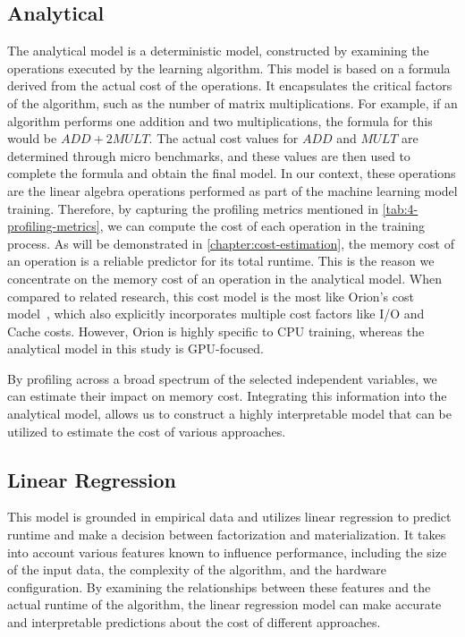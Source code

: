 \subsection{Analytical}
The analytical model is a deterministic model, constructed by examining the operations executed by the learning algorithm. This model is based on a formula derived from the actual cost of the operations. It encapsulates the critical factors of the algorithm, such as the number of matrix multiplications. For example, if an algorithm performs one addition and two multiplications, the formula for this would be $ADD + 2MULT$. The actual cost values for $ADD$ and $MULT$ are determined through micro benchmarks, and these values are then used to complete the formula and obtain the final model. In our context, these operations are the linear algebra operations performed as part of the machine learning model training. Therefore, by capturing the profiling metrics mentioned in \autoref{tab:4-profiling-metrics}, we can compute the cost of each operation in the training process. As will be demonstrated in \autoref{chapter:cost-estimation}, the memory cost of an operation is a reliable predictor for its total runtime. This is the reason we concentrate on the memory cost of an operation in the analytical model. When compared to related research, this cost model is the most like Orion's cost model~\cite{orion_learning_gen_lin_models}, which also explicitly incorporates multiple cost factors like I/O and Cache costs. However, Orion is highly specific to CPU training, whereas the analytical model in this study is GPU-focused.

By profiling across a broad spectrum of the selected independent variables, we can estimate their impact on memory cost. Integrating this information into the analytical model, allows us to construct a highly interpretable model that can be utilized to estimate the cost of various approaches.

\subsection{Linear Regression}
This model is grounded in empirical data and utilizes linear regression to predict runtime and make a decision between factorization and materialization. It takes into account various features known to influence performance, including the size of the input data, the complexity of the algorithm, and the hardware configuration. By examining the relationships between these features and the actual runtime of the algorithm, the linear regression model can make accurate and interpretable predictions about the cost of different approaches.


